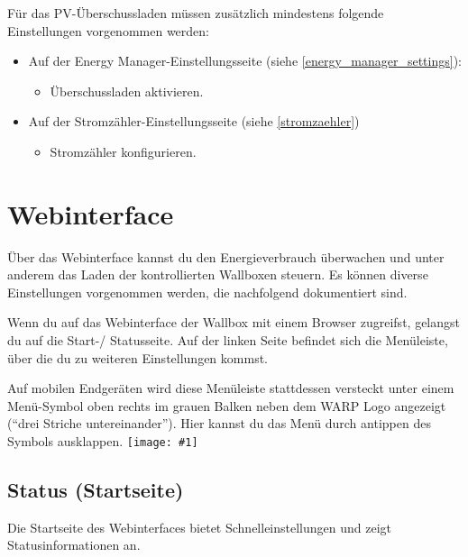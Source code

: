\documentclass[a4paper,10pt]{article}
\newcommand{\gfx}[1]{\texttt{[image: \#1]}}
\begin{document}
\begin{multicols*}{2}
	Für das PV-Überschussladen müssen zusätzlich mindestens folgende Einstellungen vorgenommen werden:
	\begin{itemize}
	 \item Auf der Energy Manager-Einstellungsseite (siehe \ref{energy_manager_settings}):
	 \begin{itemize}
		\item Überschussladen aktivieren.
	 \end{itemize}
	 \item Auf der Stromzähler-Einstellungsseite (siehe \ref{stromzaehler})
	 \begin{itemize}
		\item Stromzähler konfigurieren.
	 \end{itemize}
	\end{itemize}

	\newpage
	\section{Webinterface}
	\label{webinterface}
	\vspace{-0.2cm}

	Über das Webinterface kannst du den Energieverbrauch überwachen und
	unter anderem das Laden der kontrollierten Wallboxen steuern.
	Es können diverse Einstellungen vorgenommen werden, die nachfolgend
	dokumentiert sind.

	Wenn du auf das Webinterface der Wallbox mit einem Browser zugreifst,
	gelangst du auf die Start-/ Statusseite. Auf der linken Seite befindet sich
	die Menüleiste, über die du zu weiteren Einstellungen kommst.

	Auf mobilen Endgeräten wird
	diese Menüleiste stattdessen versteckt unter einem Menü-Symbol oben rechts
	im grauen Balken neben dem WARP Logo angezeigt (\enquote{drei Striche untereinander}).
	Hier kannst du das Menü durch antippen des Symbols ausklappen.
	\gfx{./img/resized/web_status}

	\vspace{-0.4cm}
	\subsection{Status (Startseite)}
	\label{status}
	Die Startseite des Webinterfaces bietet Schnelleinstellungen und zeigt Statusinformationen an.


\end{multicols*}
\end{document}
